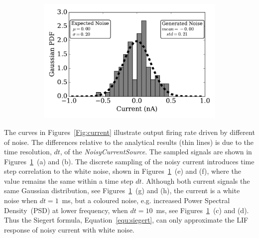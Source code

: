 \begin{figure}[tbp!]
\begin{subfigure}[t]{0.43\textwidth}
			\includegraphics[width=\textwidth]{pics_iconip/distr_dt10.pdf}
			\caption{}
		\end{subfigure}
		\caption{\textit{} }
		\label{Fig:lif_curr}
	\end{figure}

	\DIFaddend The curves in Figures~\ref{Fig:current} illustrate \DIFaddbegin {}\DIFaddend output firing rate driven by different \DIFdelbegin {}\DIFdelend \DIFaddbegin {}\DIFaddend of noise.
	The differences relative to the analytical results (thin lines) is due to the time resolution, $dt$, of the \textit{NoisyCurrentSource}.
	The sampled signals are shown in Figures~\ref{Fig:lif_curr}~(a) and (b).
	The discrete sampling of the noisy current introduces time step correlation to the white noise, shown in Figures~\ref{Fig:lif_curr}~(e) and (f), where the value remains the same within a time step $dt$.
	Although both current signals \DIFdelbegin {}\DIFdelend \DIFaddbegin {}\DIFaddend the same Gaussian distribution, see Figures~\ref{Fig:lif_curr}~(g) and (h), the current is a white noise when $dt=1$~ms, but a coloured noise, e.g. increased Power Spectral Density~(PSD) at lower frequency, when $dt=10$~ms, see Figures~\ref{Fig:lif_curr}~(c) and (d).
	Thus the Siegert formula, Equation~\ref{equ:siegert}, can only approximate the LIF response of noisy current with white noise.
\DIFdelbegin %

